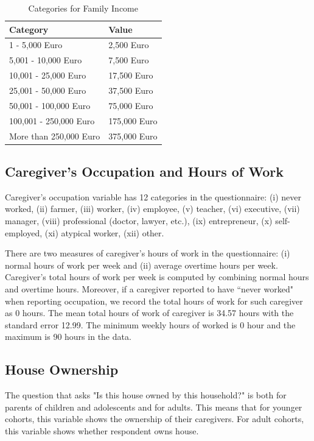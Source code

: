 \begin{table}[H]
\caption{Categories for Family Income} \label{tab:faminc}
\begin{center}
\begin{tabular}{ll}
\toprule
\textbf{Category} & \textbf{Value} \\ \midrule
	1 - 5,000 Euro					 & 2,500 Euro \\
	5,001 - 10,000 Euro				 & 7,500 Euro \\
	10,001 - 25,000 Euro			 & 17,500 Euro \\
	25,001 - 50,000 Euro			 & 37,500 Euro \\
	50,001 - 100,000 Euro			 & 75,000 Euro \\
	100,001 - 250,000 Euro			 & 175,000 Euro \\
	More than 250,000 Euro			 & 375,000 Euro \\ \bottomrule
\end{tabular}
\end{center}
\end{table}
	
\subsection{Caregiver's Occupation and Hours of Work}
Caregiver's occupation variable has 12 categories in the questionnaire: (i) never worked, (ii) farmer, (iii) worker, (iv) employee, (v) teacher, (vi) executive, (vii) manager, (viii) professional (doctor, lawyer, etc.), (ix) entrepreneur, (x) self-employed, (xi) atypical worker, (xii) other.  

There are two measures of caregiver's hours of work in the questionnaire: (i) normal hours of work per week and (ii) average overtime hours per week. Caregiver's total hours of work per week is computed by combining normal hours and overtime hours. Moreover, if a caregiver reported to have ``never worked" when reporting occupation, we record the total hours of work for such caregiver as 0 hours. The mean total hours of work of caregiver is  34.57 hours with the standard error 12.99. The minimum weekly hours of worked is 0 hour and the maximum is 90 hours in the data.

\subsection{House Ownership}
The question that asks "Is this house owned by this household?" is both for parents of children and adolescents and for adults. This means that for younger cohorts, this variable shows the ownership of their caregivers. For adult cohorts, this variable shows whether respondent owns house. 
